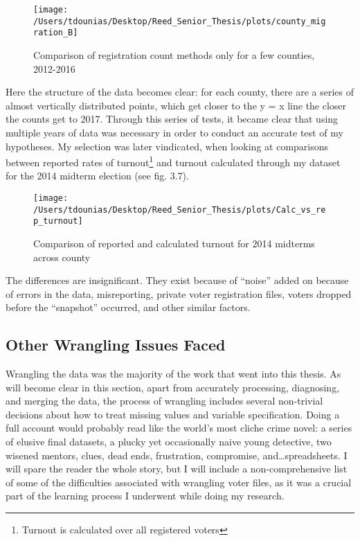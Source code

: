 \documentclass[12pt,twoside]{reedthesis}
\begin{document}
  \begin{figure}
  
  {\centering \texttt{[image: /Users/tdounias/Desktop/Reed\_Senior\_Thesis/plots/county\_migration\_B]} 
  
  }
  
  \caption[Comparison of registration count methods only for a few counties, 2012-2016]{Comparison of registration count methods only for a few counties, 2012-2016}\label{fig:county migration B}
  \end{figure}
  
  Here the structure of the data becomes clear: for each county, there are
  a series of almost vertically distributed points, which get closer to
  the y = x line the closer the counts get to 2017. Through this series of
  tests, it became clear that using multiple years of data was necessary
  in order to conduct an accurate test of my hypotheses. My selection was
  later vindicated, when looking at comparisons between reported rates of
  turnout\footnote{Turnout is calculated over all registered voters} and
  turnout calculated through my dataset for the 2014 midterm election (see
  fig. 3.7).
  
  \begin{figure}
  
  {\centering \texttt{[image: /Users/tdounias/Desktop/Reed\_Senior\_Thesis/plots/Calc\_vs\_rep\_turnout]} 
  
  }
  
  \caption[Comparison of reported and calculated turnout for 2014 midterms across county]{Comparison of reported and calculated turnout for 2014 midterms across county}\label{fig:comp turnout 2014}
  \end{figure}
  
  The differences are insignificant. They exist because of ``noise'' added
  on because of errors in the data, misreporting, private voter
  registration files, voters dropped before the ``snapshot'' occurred, and
  other similar factors.
  
  \subsection{Other Wrangling Issues
  Faced}\label{other-wrangling-issues-faced}
  
  Wrangling the data was the majority of the work that went into this
  thesis. As will become clear in this section, apart from accurately
  processing, diagnosing, and merging the data, the process of wrangling
  includes several non-trivial decisions about how to treat missing values
  and variable specification. Doing a full account would probably read
  like the world's most cliche crime novel: a series of elusive final
  datasets, a plucky yet occasionally naive young detective, two wisened
  mentors, clues, dead ends, frustration, compromise,
  and\ldots{}spreadsheets. I will spare the reader the whole story, but I
  will include a non-comprehensive list of some of the difficulties
  associated with wrangling voter files, as it was a crucial part of the
  learning process I underwent while doing my research.
  
\end{document}
